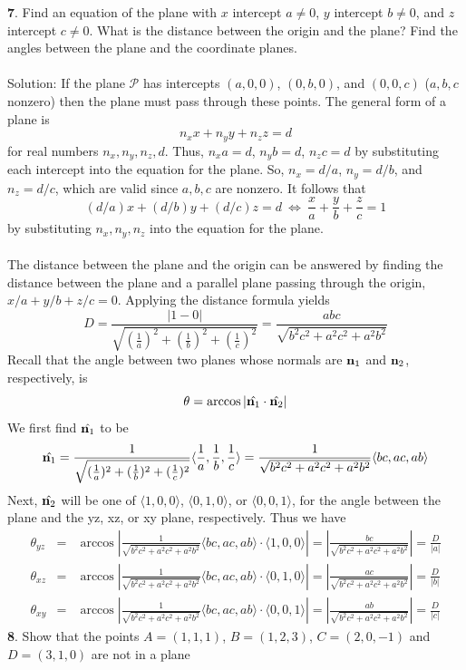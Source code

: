 \documentclass[12pt]{amsbook}
\newcommand{\la}{\langle}
\newcommand{\ra}{\rangle}
\begin{document}
{\small\bf 7}. Find an equation of the plane with $x$ intercept $a\neq 0$,
$y$ intercept $b\neq 0$, and $z$ intercept $c\neq 0$. What is the distance
between the origin and the plane? Find the angles between the plane
and the coordinate planes.\\
\\
{\sc Solution}: If the plane $\mathcal{P}$ has intercepts $(a,0,0)$, $(0,b,0)$, and $(0,0,c)$ ($a,b,c$ nonzero) then the plane must pass through these points. The general form of a plane is
$$n_xx+n_yy+n_zz=d$$
for real numbers $n_x,n_y,n_z,d$. Thus,
$n_xa=d$, $n_yb=d$, $n_zc=d$ by substituting each intercept into the equation for the plane. So, $n_x=d/a$, $n_y=d/b$, and $n_z=d/c$, which are valid since $a,b,c$ are nonzero. It follows that
$$(d/a)x+(d/b)y+(d/c)z=d \ \Leftrightarrow \ \frac{x}{a}+\frac{y}{b}+\frac{z}{c}=1$$
by substituting $n_x,n_y,n_z$ into the equation for the plane.
\\
\\
The distance between the plane and the origin can be answered by finding the distance between the plane and a parallel plane passing through the origin, $x/a+y/b+z/c=0$. Applying the distance formula yields
$$D=\frac{|1-0|}{\sqrt{(\frac{1}{a})^2+(\frac{1}{b})^2+(\frac{1}{c})^2}}=\frac{abc}{\sqrt{b^2c^2+a^2c^2+a^2b^2}}$$
Recall that the angle between two planes whose normals are ${\bf n}_1$ and ${\bf n}_2$, respectively, is
$$\theta=\arccos |\hat{{\bf n}_1}\cdot \hat{{\bf n}_2}|$$
We first find $\hat{{\bf n}_1}$ to be
$$\hat{{\bf n}_1}=\frac{1}{\sqrt{(\frac{1}{a})^2+(\frac{1}{b})^2+(\frac{1}{c})^2}}\la \frac{1}{a}, \frac{1}{b} , \frac{1}{c}\ra=\frac{1}{\sqrt{b^2c^2+a^2c^2+a^2b^2}}\la bc, ac, ab \ra$$
Next, $\hat{{\bf n}_2}$ will be one of $\la 1,0,0\ra$, $\la 0,1,0\ra$, or $\la 0,0,1\ra$, for the angle between the plane and the yz, xz, or xy plane, respectively. Thus we have
\begin{eqnarray*}
\theta_{yz}&=&\arccos|\frac{1}{\sqrt{b^2c^2+a^2c^2+a^2b^2}}\la bc, ac, ab \ra\cdot \la 1,0,0 \ra| = |\frac{bc}{\sqrt{b^2c^2+a^2c^2+a^2b^2}}|=\frac{D}{|a|}\\
\theta_{xz}&=&\arccos|\frac{1}{\sqrt{b^2c^2+a^2c^2+a^2b^2}}\la bc, ac, ab \ra\cdot \la 0,1,0 \ra| = |\frac{ac}{\sqrt{b^2c^2+a^2c^2+a^2b^2}}|=\frac{D}{|b|}\\
\theta_{xy}&=&\arccos|\frac{1}{\sqrt{b^2c^2+a^2c^2+a^2b^2}}\la bc, ac, ab \ra\cdot \la 0,0,1 \ra| = |\frac{ab}{\sqrt{b^2c^2+a^2c^2+a^2b^2}}|=\frac{D}{|c|}
\end{eqnarray*}
{\small\bf 8}. Show that the points
 $A=(1,1,1)$, $B=(1,2,3)$, $C=(2,0,-1)$ and $D=(3,1,0)$ are not in a plane
\end{document}
